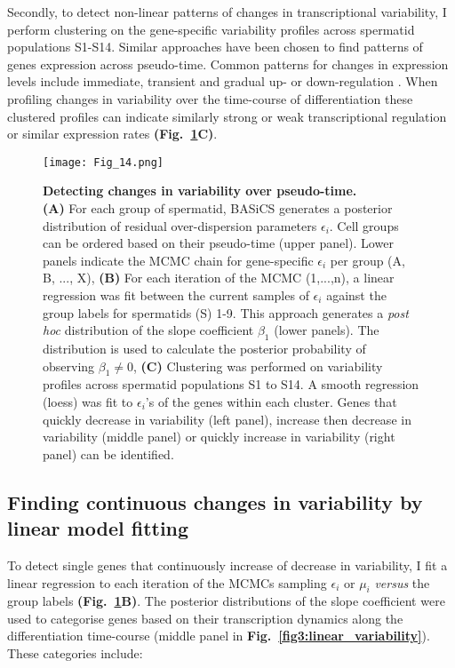 Secondly, to detect non-linear patterns of changes in transcriptional variability, I perform clustering on the gene-specific variability profiles across spermatid populations S1-S14. Similar approaches have been chosen to find patterns of genes expression across pseudo-time. Common patterns for changes in expression levels include immediate, transient and gradual up- or down-regulation \citep{Trapnell2014}. When profiling changes in variability over the time-course of differentiation these clustered profiles can indicate similarly strong or weak transcriptional regulation or similar expression rates \textbf{(Fig.~\ref{fig3:variability_schematic}C)}.

\newpage

\begin{figure}[!h]
\centering
\texttt{[image: Fig\_14.png]}
\caption[Detecting changes in variability over pseudo-time]{\textbf{Detecting changes in variability over pseudo-time.}\\
\textbf{(A)} For each group of spermatid, BASiCS  generates a posterior distribution of residual over-dispersion parameters $\epsilon_i$. Cell groups can be ordered based on their pseudo-time (upper panel). Lower panels indicate the MCMC chain for gene-specific $\epsilon_i$ per group (A, B, ..., X), \textbf{(B)} For each iteration of the MCMC (1,...,n), a linear regression was fit between the current samples of $\epsilon_i$ against the group labels for spermatids (S) 1-9. This approach generates a \emph{post hoc} distribution of the slope coefficient $\beta_1$ (lower panels). The distribution is used to calculate the posterior probability of observing $\beta_1\neq0$, \textbf{(C)} Clustering was performed on variability profiles across spermatid populations S1 to S14. A smooth regression (loess) was fit to $\epsilon_i$'s of the genes within each cluster. Genes that quickly decrease in variability (left panel), increase then decrease in variability (middle panel) or quickly increase in variability (right panel) can be identified.}
\label{fig3:variability_schematic}
\end{figure}

\newpage

\subsection{Finding continuous changes in variability by linear model fitting}

To detect single genes that continuously increase of decrease in variability, I fit a linear regression to each iteration of the MCMCs sampling $\epsilon_i$ or $\mu_i$ \emph{versus} the group labels \textbf{(Fig.~\ref{fig3:variability_schematic}B)}. The posterior distributions of the slope coefficient were used to categorise genes based on their transcription dynamics along the differentiation time-course (middle panel in \textbf{Fig.~\ref{fig3:linear_variability}}). These categories include: 


